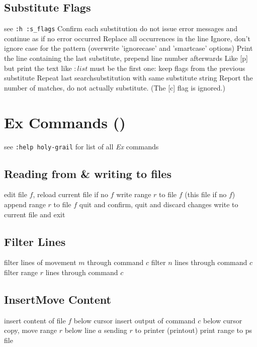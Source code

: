 \subsection{Substitute Flags}	{see {\tt :h :s\_flags}}
	{Confirm each substitution}
	{ do not issue error messages and continue as if no error occurred}
	{Replace all occurrences in the line}
	{Ignore, don't ignore case for the pattern (overwrite 'ignorecase' and 'smartcase' options)}
	{Print the line containing the last substitute, prepend line number afterwards}
	{Like [p] but print the text like $:list$}
\cmdOper{\&}	{must be the first one: keep flags from the previous substitute}
	{Repeat last search\or substitution with same substitute string}
	{Report the number of matches, do not actually substitute.  (The [c] flag is ignored.) }

\vskip -0.2cm
\section{Ex Commands (\enter)}	{see {\tt :help holy-grail} for list of all {\it Ex\/} commands}
\subsection{Reading from \& writing to files}	{}
	{edit file $f$, reload current file if no $f$}
	{write range $r$ to file $f$ (this file if no $f$)}
	{append range $r$ to file $f$}
	{quit and confirm, quit and discard changes}
	{write to current file and exit}

\subsection{Filter Lines}{}
	{filter lines of movement $m$ through command $c$}
	{filter $n$ lines through command $c$}
	{filter range $r$ lines through command $c$}

\subsection{Insert\or Move Content}	{}
	{insert content of file $f$ below cursor}
	{insert output of command $c$ below cursor}
	{copy, move range $r$ below line $a$}
	{sending $r$ to printer (printout)}
	{print range to ps file}

